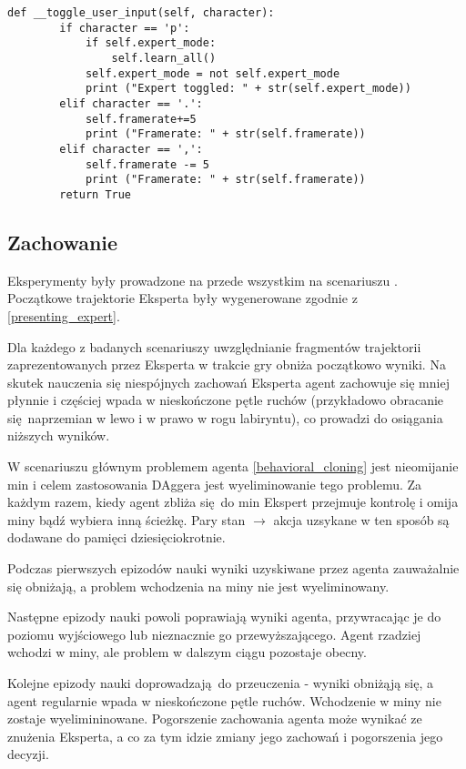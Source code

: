 \begin{lstlisting}[language=iPython]
    def __toggle_user_input(self, character):
        if character == 'p':
            if self.expert_mode:
                self.learn_all()
            self.expert_mode = not self.expert_mode
            print ("Expert toggled: " + str(self.expert_mode))
        elif character == '.':
            self.framerate+=5
            print ("Framerate: " + str(self.framerate))
        elif character == ',':
            self.framerate -= 5
            print ("Framerate: " + str(self.framerate))
        return True
\end{lstlisting}

\subsection{Zachowanie}
Eksperymenty były prowadzone na przede wszystkim na scenariuszu . Początkowe trajektorie Eksperta były wygenerowane zgodnie z \ref{presenting_expert}.

Dla każdego z badanych scenariuszy uwzględnianie fragmentów trajektorii zaprezentowanych przez Eksperta w trakcie gry obniża początkowo wyniki. Na skutek nauczenia się niespójnych zachowań Eksperta agent zachowuje się mniej płynnie i częściej wpada w nieskończone pętle ruchów (przykładowo obracanie się naprzemian w lewo i w prawo w rogu labiryntu), co prowadzi do osiągania niższych wyników.

W scenariuszu  głównym problemem agenta \ref{behavioral_cloning} jest nieomijanie min i celem zastosowania DAggera jest wyeliminowanie tego problemu. Za każdym razem, kiedy agent zbliża się do min Ekspert przejmuje kontrolę i omija miny bądź wybiera inną ścieżkę. Pary stan $\to$ akcja uzsykane w ten sposób są dodawane do pamięci dziesięciokrotnie.

Podczas pierwszych epizodów nauki wyniki uzyskiwane przez agenta zauważalnie się obniżają, a problem wchodzenia na miny nie jest wyeliminowany.

Następne epizody nauki powoli poprawiają wyniki agenta, przywracając je do poziomu wyjściowego lub nieznacznie go przewyższającego. Agent rzadziej wchodzi w miny, ale problem w dalszym ciągu pozostaje obecny.

Kolejne epizody nauki doprowadzają do przeuczenia - wyniki obniżąją się, a agent regularnie wpada w nieskończone pętle ruchów. Wchodzenie w miny nie zostaje wyelimininowane. Pogorszenie zachowania agenta może wynikać ze znużenia Eksperta, a co za tym idzie zmiany jego zachowań i pogorszenia jego decyzji.

